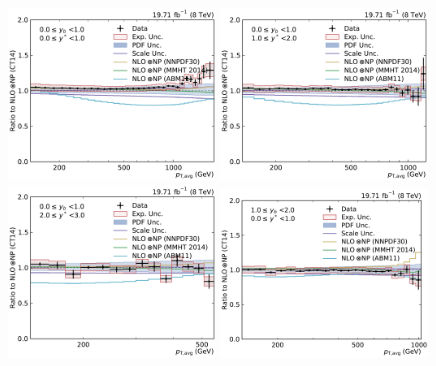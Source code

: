 \begin{figure}[htbp]
    \centering
    \includegraphics[width=0.49\textwidth]{figures/measurement/ratio_to_CT14nlo+np_totcomp_yb0ys0.pdf}\hfill
    \includegraphics[width=0.49\textwidth]{figures/measurement/ratio_to_CT14nlo+np_totcomp_yb0ys1.pdf}
    \includegraphics[width=0.49\textwidth]{figures/measurement/ratio_to_CT14nlo+np_totcomp_yb0ys2.pdf}\hfill
    \includegraphics[width=0.49\textwidth]{figures/measurement/ratio_to_CT14nlo+np_totcomp_yb1ys0.pdf}

\end{figure}
